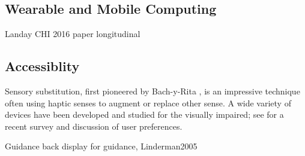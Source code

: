 
\subsection{Wearable and Mobile Computing}

\cite{Brown2006}
Landay CHI 2016 paper longitudinal


\subsection{Accessiblity }
Sensory substitution, first pioneered by Bach-y-Rita \cite{Bach-y-Rita1969}, is an impressive technique often using haptic senses to augment or replace other sense.
A wide variety of devices have been developed and studied for the visually impaired; see \citep{Hamilton-Fletcher2016} for a recent survey and discussion of user preferences.

Guidance \cite{Tan2003} back display for guidance, Linderman2005 \cite{Arab2015} \cite{Prasad2014} \cite{Pielot2009}

